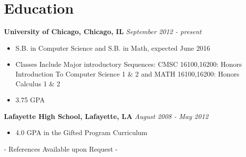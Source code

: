 \documentclass[11pt,letterpaper]{article} %
\begin{document}
    \section*{Education}
        \textbf{University of Chicago, Chicago, IL } \hfill \textit{ September 2012 - present } 
        \begin{itemize} 
            \item S.B. in Computer Science and S.B. in Math, expected June 2016 
            \item Classes Include Major introductory Sequences: CMSC 16100,16200: 
                Honors Introduction To Computer Science 1 \& 2 and 
                MATH 16100,16200: Honors Calculus 1 \& 2
            \item 3.75 GPA
        \end{itemize}
        \textbf{ Lafayette High School, Lafayette, LA } \hfill \textit{August 2008 - May 2012 }  
        \begin{itemize} 
            \item 4.0 GPA in the  Gifted Program Curriculum
            \end{itemize}
    \null
    \vfill
    \centerline{ - References Available upon Request - }
\end{document}

